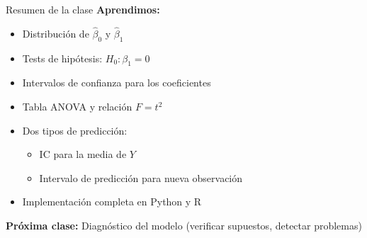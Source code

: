 \documentclass[aspectratio=169]{beamer}
\begin{document}
\begin{frame}{Resumen de la clase}
\textbf{Aprendimos:}
\begin{itemize}
    \item Distribución de $\hat{\beta}_0$ y $\hat{\beta}_1$
    \item Tests de hipótesis: $H_0: \beta_1 = 0$
    \item Intervalos de confianza para los coeficientes
    \item Tabla ANOVA y relación $F = t^2$
    \item Dos tipos de predicción:
    \begin{itemize}
        \item IC para la media de $Y$
        \item Intervalo de predicción para nueva observación
    \end{itemize}
    \item Implementación completa en Python y R
\end{itemize}

\vspace{0.5cm}
\textbf{Próxima clase:} Diagnóstico del modelo (verificar supuestos, detectar problemas)
\end{frame}
\end{document}
